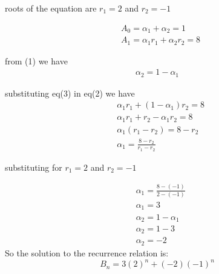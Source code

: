 \documentclass[12pt]{article}
\begin{document}
roots of the equation are $r_1 = 2$ and $r_2 = -1$

\begin{align}
&A_0 = \alpha_1 + \alpha_2 = 1\\[7pt]
&A_1 = \alpha_1r_1 + \alpha_2r_2 = 8
\end{align}

from (1) we have 
\begin{align}
\alpha_2 = 1 - \alpha_1
\end{align}

substituting eq(3) in eq(2) we have
\begin{align*}
&\alpha_1r_1 + (1 - \alpha_1)r_2 = 8\\[7pt]
&\alpha_1r_1 + r_2 - \alpha_1r_2 = 8\\[7pt]
&\alpha_1(r_1 - r_2)  = 8 -r_2\\[7pt]
&\alpha_1 = \frac{8- r_2}{r_1 - r_2}
\end{align*}

substituting for $r_1 = 2$ and $r_2 = -1$

\begin{align*}
&\alpha_1 = \frac{8- (-1)}{2 - (-1)}\\[7pt]
&\alpha_1 = 3\\[7pt]
&\alpha_2 = 1 - \alpha_1\\[7pt]
&\alpha_2 = 1 - 3\\[7pt]
&\alpha_2 = -2
\end{align*}
So the solution to the recurrence relation is:
$$B_n = 3(2)^n +(-2)(-1)^n$$
\end{document}
